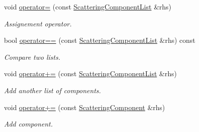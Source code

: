 \begin{DoxyCompactItemize}
void \mbox{\hyperlink{class_obj_cryst_1_1_scattering_component_list_a93c5514484bd8d32a346e1c4a155a4a3}{operator=}} (const \mbox{\hyperlink{class_obj_cryst_1_1_scattering_component_list}{Scattering\+Component\+List}} \&rhs)
\begin{DoxyCompactList}\small\item\em Assignement operator. \end{DoxyCompactList}\item 
\mbox{\label{class_obj_cryst_1_1_scattering_component_list_a1081a126cf9fdead628e8ccb3e797272}} 
bool \mbox{\hyperlink{class_obj_cryst_1_1_scattering_component_list_a1081a126cf9fdead628e8ccb3e797272}{operator==}} (const \mbox{\hyperlink{class_obj_cryst_1_1_scattering_component_list}{Scattering\+Component\+List}} \&rhs) const
\begin{DoxyCompactList}\small\item\em Compare two lists. \end{DoxyCompactList}\item 
\mbox{\label{class_obj_cryst_1_1_scattering_component_list_a423df65157ec66cda8f5542116bc63f8}} 
void \mbox{\hyperlink{class_obj_cryst_1_1_scattering_component_list_a423df65157ec66cda8f5542116bc63f8}{operator+=}} (const \mbox{\hyperlink{class_obj_cryst_1_1_scattering_component_list}{Scattering\+Component\+List}} \&rhs)
\begin{DoxyCompactList}\small\item\em Add another list of components. \end{DoxyCompactList}\item 
\mbox{\label{class_obj_cryst_1_1_scattering_component_list_a36ea90b4b48c473af0bee85402479f82}} 
void \mbox{\hyperlink{class_obj_cryst_1_1_scattering_component_list_a36ea90b4b48c473af0bee85402479f82}{operator+=}} (const \mbox{\hyperlink{struct_obj_cryst_1_1_scattering_component}{Scattering\+Component}} \&rhs)
\begin{DoxyCompactList}\small\item\em Add component. \end{DoxyCompactList}\item 
\mbox{\label{class_obj_cryst_1_1_scattering_component_list_a8524c2bc3633441b2a808b2908ce99ec}} 

\end{DoxyCompactItemize}
